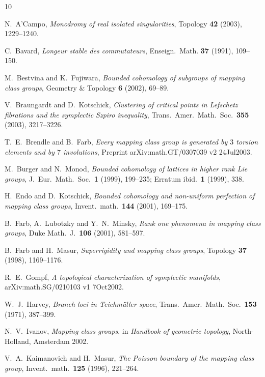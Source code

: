 \documentclass[12pt]{amsart}
\theoremstyle{remark}
\theoremstyle{definition}
\begin{document}


\begin{thebibliography}{10}

N.~A'Campo, {\em Monodromy of real isolated singularities}, Topology 
{\bf 42} (2003), 1229--1240.

C.~Bavard, {\em Longeur stable des commutateurs},
Enseign.~Math. {\bf 37} (1991), 109--150.

M.~Bestvina and K.~Fujiwara,
{\em Bounded cohomology of subgroups of mapping class groups}, 
Geometry $\&$ Topology {\bf 6} (2002), 69--89.

V.~Braungardt and D.~Kotschick, {\em Clustering of critical points
in Lefschetz fibrations and the symplectic Szpiro inequality},
Trans.~Amer.~Math.~Soc.~{\bf 355} (2003), 3217--3226.

T.~E.~Brendle and B.~Farb,
{\em Every mapping class group is generated by $3$ torsion elements and
by $7$ involutions}, Preprint arXiv:math.GT/0307039 v2 24Jul2003.

M.~Burger and N.~Monod, {\em Bounded cohomology of lattices in higher 
rank Lie groups}, J.~Eur.~Math.~Soc.~{\bf 1} (1999), 199--235; Erratum 
ibid.~{\bf 1} (1999), 338.

H.~Endo and D.~Kotschick,
{\em Bounded cohomology and non-uniform perfection of mapping class 
groups},
Invent.~math.~{\bf 144} (2001), 169--175.


B.~Farb, A.~Lubotzky and Y.~N.~Minsky, {\em Rank one phenomena in 
mapping class groups}, Duke Math.~J.~{\bf 106} (2001), 581--597.

B.~Farb and H.~Masur, {\em Superrigidity and mapping class groups}, 
Topology {\bf 37} (1998), 1169--1176.

R.~E.~Gompf, {\em A topological characterization of symplectic manifolds},
arXiv:math.SG/0210103 v1 7Oct2002.

W.~J.~Harvey,
{\em Branch loci in Teichm\"uller space}, 
Trans.~Amer.~Math.~Soc.~{\bf 153} (1971), 387--399.

N.~V.~Ivanov, {\em Mapping class groups}, in {\sl Handbook of geometric
topology}, North-Holland, Amsterdam 2002.

V.~A.~Kaimanovich and H.~Masur, {\em The Poisson boundary of the 
mapping class group}, Invent.~math.~{\bf 125} (1996), 221--264.


\end{thebibliography}
\end{document}
